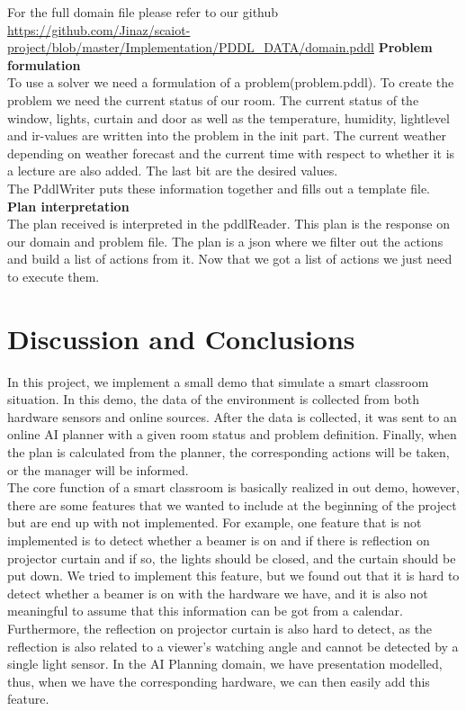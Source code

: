 \documentclass[runningheads]{llncs}
\begin{document}
For the full domain file please refer to our github \url{https://github.com/Jinaz/scaiot-project/blob/master/Implementation/PDDL_DATA/domain.pddl}
\newline
\textbf{Problem formulation}\\
To use a solver we need a formulation of a problem(problem.pddl).
To create the problem we need the current status of our room.
The current status of the window, lights, curtain and door as well as the temperature, humidity, lightlevel and ir-values are written into the problem in the init part. The current weather depending on weather forecast and the current time with respect to whether it is a lecture are also added. 
The last bit are the desired values.\\
The PddlWriter puts these information together and fills out a template file. 
\newline
\textbf{Plan interpretation}\\
The plan received is interpreted in the pddlReader. This plan is the response on our domain and problem file. The plan is a json where we filter out the actions and build a list of actions from it. 
Now that we got a list of actions we just need to execute them.

\section{Discussion and Conclusions}
\label{sec:dc}
In this project, we implement a small demo that simulate a smart classroom situation. In this demo, the data of the environment is collected from both hardware sensors and online sources. After the data is collected, it was sent to an online AI planner with a given room status and problem definition. Finally, when the plan is calculated from the planner, the corresponding actions will be taken, or the manager will be informed.\\

The core function of a smart classroom is basically realized in out demo, however, there are some features that we wanted to include at the beginning of the project but are end up with not implemented. For example, one feature that is not implemented is to detect whether a beamer is on and if there is reflection on projector curtain and if so, the lights should be closed, and the curtain should be put down. We tried to implement this feature, but we found out that it is hard to detect whether a beamer is on with the hardware we have, and it is also not meaningful to assume that this information can be got from a calendar. Furthermore, the reflection on projector curtain is also hard to detect, as the reflection is also related to a viewer’s watching angle and cannot be detected by a single light sensor. In the AI Planning domain, we have presentation modelled, thus, when we have the corresponding hardware, we can then easily add this feature.\\
\end{document}
